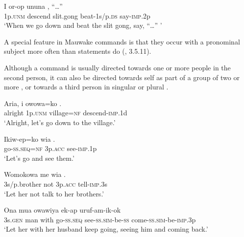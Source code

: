 \ea%
\label{ex:7:x1083}
\gll I  or-op  ununa    ,  ``{\dots''} \\
1p.\textsc{unm}  descend  slit.gong  beat-1s/p.\textsc{ds}  say-\textsc{imp}.2p      \\
\glt `When we go down and beat the slit gong, say, ``{\dots}'' '
\z



A special feature in Mauwake commands is that they occur with a pronominal  subject more often than statements do (, 3.5.11). 

Although a command is usually directed towards one or more people in the second person, it can also be directed towards self as part of a group of two  or more , or towards a third person in singular  or plural . 

\ea%
\label{ex:7:x1157}
\gll Aria,  i  owowa=ko  . \\
 alright  1p.\textsc{unm}  village=\textsc{nf}  descend-\textsc{imp}.1d     \\
\glt `Alright, let's go down to the village.'
\z





\ea%
\label{ex:7:x1158}
\gll Ikiw-ep=ko  wia  . \\
  go-\textsc{ss}.\textsc{seq}=\textsc{nf}  3p.\textsc{acc}  see-\textsc{imp}.1p    \\
\glt `Let's go and see them.'
\z





\ea%
\label{ex:7:x1159}
\gll Womokowa  me  wia  . \\
 3s/p.brother  not  3p.\textsc{acc}  tell-\textsc{imp}.3s     \\
\glt `Let her not talk to her brothers.'
\z





\ea%
\label{ex:7:x1160}
\gll Ona  mua  owawiya  ek-ap  uruf-am-ik-ok  \\
3s.\textsc{gen}  man  with  go-\textsc{ss}.\textsc{seq}  see-\textsc{ss}.\textsc{sim}-be-\textsc{ss}  come-\textsc{ss}.\textsc{sim}-be-\textsc{imp}.3p    \\
\glt `Let her with her husband keep going, seeing him and coming back.'
\z









